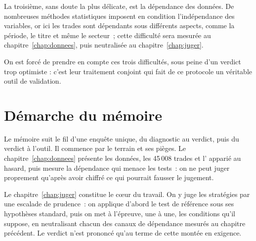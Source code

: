 La troisième, sans doute la plus délicate, est la dépendance
des données. De nombreuses méthodes statistiques
imposent en condition l'indépendance des variables, or ici les trades sont
dépendants sous différents aspects, comme la période, le titre et même le secteur~;
cette difficulté sera mesurée au chapitre~\ref{chap:donnees}, puis neutralisée
au chapitre~\ref{chap:juger}.

On est forcé de prendre en compte ces trois difficultés, sous peine
d'un verdict trop optimiste : c'est leur traitement conjoint qui fait de ce
protocole un véritable outil de validation.

\section*{Démarche du mémoire}
\label{sec:planification}

%
%

Le mémoire suit le fil d'une enquête unique, du diagnostic au verdict, puis
du verdict à l'outil. Il commence par le terrain et ses pièges. Le
chapitre~\ref{chap:donnees} présente les données, les 45\,008 trades et
l'\edgevar{} apparié au hasard, puis mesure la dépendance qui menace les
tests~: on ne peut juger proprement qu'après avoir chiffré ce qui pourrait
fausser le jugement.

Le chapitre~\ref{chap:juger} constitue le cœur du travail. On y juge les
stratégies par une escalade de prudence~: on applique d'abord le test de
référence sous ses hypothèses standard, puis on met à l'épreuve, une à une,
les conditions qu'il suppose, en neutralisant chacun des canaux de dépendance
mesurés au chapitre précédent. Le verdict n'est prononcé qu'au terme de cette
montée en exigence.

